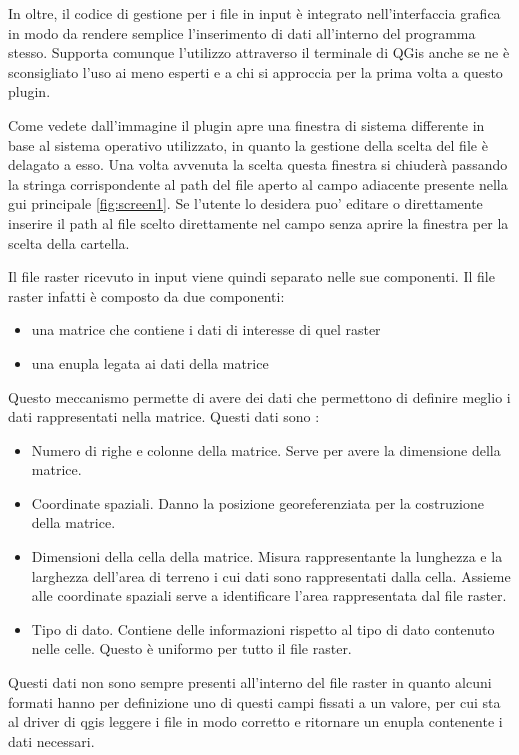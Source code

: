 In oltre, il codice di gestione per i file in input è integrato nell'interfaccia grafica in modo da rendere semplice l'inserimento di dati all'interno del programma stesso. Supporta comunque l'utilizzo attraverso il terminale di QGis anche se ne è sconsigliato l'uso ai meno esperti e a chi si approccia per la prima volta a questo plugin.

Come vedete dall'immagine il plugin apre una finestra di sistema differente in base al sistema operativo utilizzato, in quanto la gestione della scelta del file è delagato a esso. Una volta avvenuta la scelta questa finestra si chiuderà passando la stringa corrispondente al path del file aperto al campo adiacente presente nella gui principale \ref{fig:screen1}. %
Se l'utente lo desidera puo' editare o direttamente inserire il path al file scelto direttamente nel campo senza aprire la finestra per la scelta della cartella.

Il file raster ricevuto in input viene quindi separato nelle sue componenti. Il file raster infatti è composto da due componenti:
\begin{itemize}
	\item una matrice che contiene i dati di interesse di quel raster
	\item una enupla legata ai dati della matrice
\end{itemize}
Questo meccanismo permette di avere dei dati che permettono di definire meglio i dati rappresentati nella matrice. Questi dati sono :

\begin{itemize}
	\item Numero di righe e colonne della matrice. Serve per avere la dimensione della matrice.
	\item Coordinate spaziali. Danno la posizione georeferenziata per la costruzione della matrice.
	\item Dimensioni della cella della matrice. Misura rappresentante la lunghezza e la larghezza dell'area di terreno i cui dati sono rappresentati dalla cella. Assieme alle coordinate spaziali serve a identificare l'area rappresentata dal file raster.
	\item Tipo di dato. Contiene delle informazioni rispetto al tipo di dato contenuto nelle celle. Questo è uniformo per tutto il file raster.
\end{itemize}

Questi dati non sono sempre presenti all'interno del file raster in quanto alcuni formati hanno per definizione uno di questi campi fissati a un valore, per cui sta al driver di qgis leggere i file in modo corretto e ritornare un enupla contenente i dati necessari.

